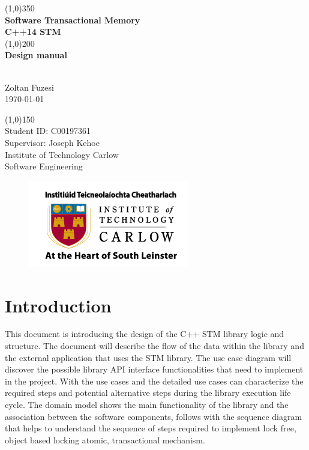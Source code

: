 \documentclass[12pt]{article}
\begin{document}
\begin{titlepage}
	\begin{center}
	\line(1,0){350}\\
	[0.3 cm]
	\huge{\textbf{Software Transactional Memory\\[0.3 cm]C++14 STM\\ }} 
	\line(1,0){200}\\
	[0.3 cm]
	\huge{\textbf{Design manual }} 
		\begin{LARGE}
		\\[0.3 cm]Zoltan Fuzesi\\
		\today
		\end{LARGE}
		
		\begin{LARGE}
		\line(1,0){150}\\
		[1.0 cm]
		Student ID: C00197361\\
		Supervisor: Joseph Kehoe\\
		\color{gray}Institute of Technology Carlow\\
		\color{gray}Software Engineering
		\end{LARGE}
		
\begin{figure}[h!]
\centering
\includegraphics[scale=0.7]{Pictures/carlow.png}
\end{figure}
		
	\end{center}
\end{titlepage}

\tableofcontents







\clearpage
{}
\setcounter{page}{1}

\section{Introduction}
This document is introducing the design of the C++ STM library logic and structure. The document will describe the flow of the data within the library and the external application that uses the STM library. The use case diagram will discover the possible library API interface functionalities that need to implement in the project. With the use cases and the detailed use cases can characterize the required steps and potential alternative steps during the library execution life cycle. The domain model shows the main functionality of the library and the association between the software components, follows with the sequence diagram that helps to understand the sequence of steps required to implement lock free, object based locking atomic, transactional mechanism.\\
\end{document}

